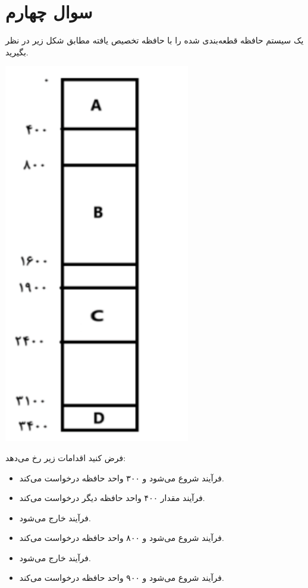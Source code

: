 \section{سوال چهارم}

یک سیستم حافظه قطعه‌بندی شده را با حافظه تخصیص یافته مطابق شکل زیر در نظر بگیرید.

\begin{center}
	\includegraphics*[width=0.2\linewidth]{pics/img1.png}
\end{center}




فرض کنید اقدامات زیر رخ می‌دهد:

\begin{itemize}
	\item فرآیند  شروع می‌شود و ۳۰۰ واحد حافظه درخواست می‌کند.
	\item فرآیند  مقدار ۴۰۰ واحد حافظه دیگر درخواست می‌کند.
	\item فرآیند  خارج می‌شود.
	\item فرآیند  شروع می‌شود و ۸۰۰ واحد حافظه درخواست می‌کند.
	\item فرآیند  خارج می‌شود.
	\item فرآیند  شروع می‌شود و ۹۰۰ واحد حافظه درخواست می‌کند.
\end{itemize}



